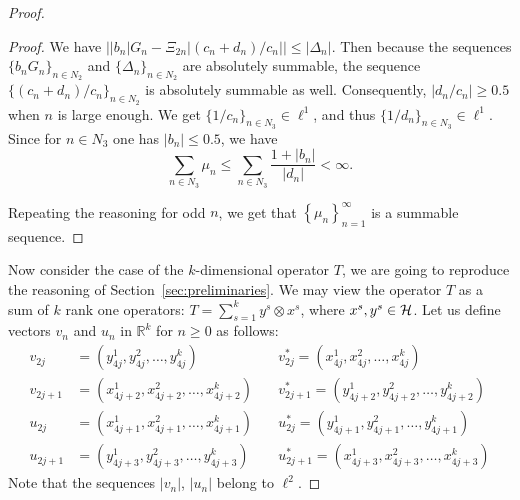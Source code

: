 \begin{proof}
\begin{proof}
        We have $\big\lvert |b_n| G_n - \Xi_{2n}\lvert (c_n + d_n)/c_n \rvert\big\rvert \leq \lvert \Delta_n \rvert$.
        Then because the sequences $\{b_n G_n\}_{n\in N_2}$ and $\{\Delta_n\}_{n \in N_2}$ are absolutely summable, the sequence
          $\{(c_n + d_n) / c_n\}_{n\in N_2} $ is absolutely summable as well.
        Consequently, $\lvert d_n/c_n \rvert \geq 0.5$ when $n$ is large enough.
        We get $\{1/c_n\}_{n \in N_3} \in \ell^1$, and thus $\{1/d_n\}_{n \in N_3} \in \ell^1$.
        Since for $n \in N_3$ one has $\lvert b_n \rvert \leq 0.5$, we have
        \[
          \sum_{n\in N_3} \mu_n \leq \sum_{n \in N_3} \frac{1 + \lvert b_n\rvert}{\lvert d_n \rvert} < \infty.
        \]

        Repeating the reasoning for odd $n$, we get that $\left\{\mu_n\right\}_{n=1}^\infty$ is a summable sequence.
      \end{proof}
      Now consider the case of the $k$-dimensional operator $T$, we are going to reproduce the reasoning of Section~\ref{sec:preliminaries}.
      We may view the operator $T$ as a sum of $k$ rank one operators: $T = \sum_{s=1}^k y^s \otimes x^s$, where $x^s, y^s \in \cal{H}$.
      Let us define vectors $v_n$ and $u_n$ in $\mathbb{R}^k$ for $n \geq 0 $ as follows:
      \begin{align*}
        v_{2j} &= (y^1_{4j}, y^2_{4j}, \dots ,y^k_{4j}) \quad
        &v^*_{2j} = (x^1_{4j}, x^2_{4j}, \dots ,x^k_{4j}) \\
        v_{2j+1} &= (x^1_{4j+2}, x^2_{4j+2}, \dots ,x^k_{4j+2}) \quad
        &v^*_{2j+1} = (y^1_{4j+2}, y^2_{4j+2}, \dots ,y^k_{4j+2}) \\
        u_{2j} &= (x^1_{4j+1}, x^2_{4j+1}, \dots ,x^k_{4j+1}) \quad
        &u^*_{2j} = (y^1_{4j+1}, y^2_{4j+1}, \dots ,y^k_{4j+1}) \\
        u_{2j+1} &= (y^1_{4j+3}, y^2_{4j+3}, \dots ,y^k_{4j+3}) \quad
        &u^*_{2j+1} = (x^1_{4j+3}, x^2_{4j+3}, \dots ,x^k_{4j+3})
      \end{align*}
      Note that the sequences $\lvert v_n \rvert$, $\lvert u_n \rvert$ belong to $\ell^2$.


\end{proof}

